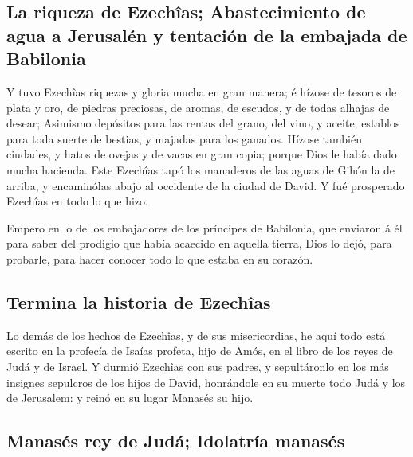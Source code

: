 \hypertarget{la-riqueza-de-ezechuxeeas-abastecimiento-de-agua-a-jerusaluxe9n-y-tentaciuxf3n-de-la-embajada-de-babilonia}{%
\subsection{La riqueza de Ezechîas; Abastecimiento de agua a Jerusalén y
tentación de la embajada de
Babilonia}\label{la-riqueza-de-ezechuxeeas-abastecimiento-de-agua-a-jerusaluxe9n-y-tentaciuxf3n-de-la-embajada-de-babilonia}}

 Y tuvo Ezechîas riquezas y gloria mucha en gran manera;
é hízose de tesoros de plata y oro, de piedras preciosas, de aromas, de
escudos, y de todas alhajas de desear;  Asimismo
depósitos para las rentas del grano, del vino, y aceite; establos para
toda suerte de bestias, y majadas para los ganados. 
Hízose también ciudades, y hatos de ovejas y de vacas en gran copia;
porque Dios le había dado mucha hacienda.  Este Ezechîas
tapó los manaderos de las aguas de Gihón la de arriba, y encaminólas
abajo al occidente de la ciudad de David. Y fué prosperado Ezechîas en
todo lo que hizo.

 Empero en lo de los embajadores de los príncipes de
Babilonia, que enviaron á él para saber del prodigio que había acaecido
en aquella tierra, Dios lo dejó, para probarle, para hacer conocer todo
lo que estaba en su corazón.

\hypertarget{termina-la-historia-de-ezechuxeeas}{%
\subsection{Termina la historia de
Ezechîas}\label{termina-la-historia-de-ezechuxeeas}}

 Lo demás de los hechos de Ezechîas, y de sus
misericordias, he aquí todo está escrito en la profecía de Isaías
profeta, hijo de Amós, en el libro de los reyes de Judá y de Israel.
 Y durmió Ezechîas con sus padres, y sepultáronlo en los
más insignes sepulcros de los hijos de David, honrándole en su muerte
todo Judá y los de Jerusalem: y reinó en su lugar Manasés su hijo.

\hypertarget{manasuxe9s-rey-de-juduxe1-idolatruxeda-manasuxe9s}{%
\subsection{Manasés rey de Judá; Idolatría
manasés}\label{manasuxe9s-rey-de-juduxe1-idolatruxeda-manasuxe9s}}

